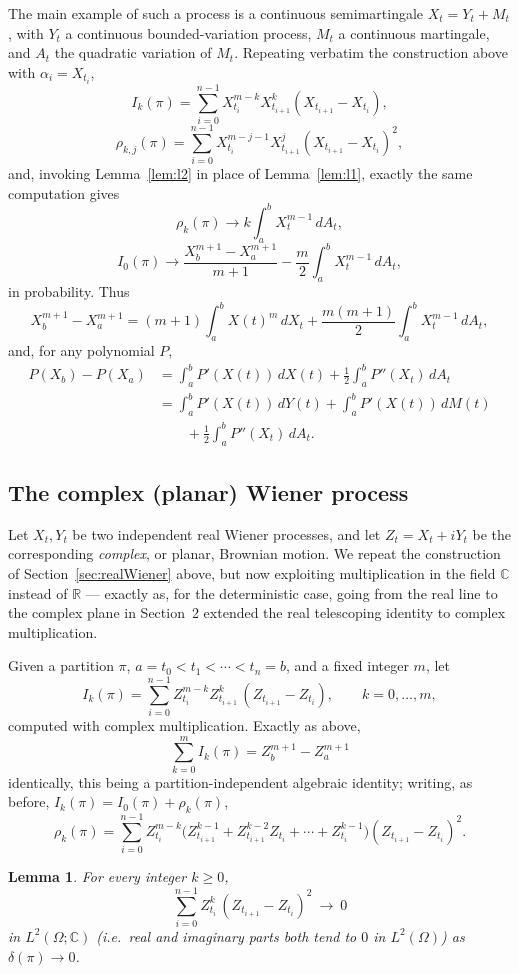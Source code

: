 \documentclass[11pt,fleqn]{article}
\def\C{\mathbb C}
\def\R{\mathbb R}
\def\ds{\displaystyle}
\theoremstyle{plain}
\newtheorem{lemma}[thm]{Lemma}
\theoremstyle{remark}
\begin{document}
The main example of such a process is a continuous semimartingale
$X_t=Y_t+M_t$, with $Y_t$ a continuous bounded-variation process, $M_t$ a
continuous martingale, and $A_t$ the quadratic variation of $M_t$.
Repeating verbatim the construction above with $\alpha_i=X_{t_i}$,
\[
I_k(\pi)=\ds\sum_{i=0}^{n-1}X_{t_i}^{m-k}X_{t_{i+1}}^k(X_{t_{i+1}}-X_{t_i}),
\]
\[
\rho_{k,j}(\pi)=\sum_{i=0}^{n-1}X_{t_i}^{m-j-1}X_{t_{i+1}}^j(X_{t_{i+1}}-X_{t_i})^2,
\]
and, invoking Lemma~\ref{lem:l2} in place of Lemma~\ref{lem:l1}, exactly
the same computation gives
\[
\rho_k(\pi)\longrightarrow k\int_a^bX_t^{m-1}\,dA_t,
\]
\[
I_0(\pi)\longrightarrow\frac{X_b^{m+1}-X_a^{m+1}}{m+1}-\frac m2\int_a^bX_t^{m-1}\,dA_t,
\]
in probability. Thus
\[
X_b^{m+1}-X_a^{m+1}=(m+1)\int_a^bX(t)^m\,dX_t+\frac{m(m+1)}2\int_a^bX_t^{m-1}\,dA_t,
\]
and, for any polynomial $P$,
\begin{align*}
P(X_b)-P(X_a)&=\int_a^bP'(X(t))\,dX(t)+\frac12\int_a^bP''(X_t)\,dA_t\\
&=\int_a^bP'(X(t))\,dY(t)+\int_a^bP'(X(t))\,dM(t)\\
&\qquad+\frac12\int_a^bP''(X_t)\,dA_t.
\end{align*}

\subsection{The complex (planar) Wiener process}

Let $X_t,Y_t$ be two independent real Wiener processes, and let
$Z_t=X_t+iY_t$ be the corresponding \emph{complex}, or planar, Brownian
motion. We repeat the construction of Section~\ref{sec:realWiener} above,
but now exploiting multiplication in the field $\C$ instead of $\R$ —
exactly as, for the deterministic case, going from the real line to the
complex plane in Section~2 extended the real telescoping identity to
complex multiplication.

Given a partition $\pi$, $a=t_0<t_1<\cdots<t_n=b$, and a fixed integer
$m$, let
\[
I_k(\pi)=\sum_{i=0}^{n-1} Z_{t_i}^{m-k}Z_{t_{i+1}}^k\,(Z_{t_{i+1}}-Z_{t_i}),
\qquad k=0,\ldots,m,
\]
computed with complex multiplication. Exactly as above,
\[
\sum_{k=0}^m I_k(\pi)=Z_b^{m+1}-Z_a^{m+1}
\]
identically, this being a partition-independent algebraic identity;
writing, as before, $I_k(\pi)=I_0(\pi)+\rho_k(\pi)$,
\[
\rho_k(\pi)=\sum_{i=0}^{n-1} Z_{t_i}^{m-k}\big(Z_{t_{i+1}}^{k-1}+
Z_{t_{i+1}}^{k-2}Z_{t_i}+\cdots+Z_{t_i}^{k-1}\big)(Z_{t_{i+1}}-Z_{t_i})^2.
\]

\begin{lemma}\label{lem:l3}
For every integer $k\ge0$,
\[
\sum_{i=0}^{n-1} Z_{t_i}^k\,(Z_{t_{i+1}}-Z_{t_i})^2\ \to\ 0
\]
in $L^2(\Omega;\C)$ (i.e.\ real and imaginary parts both tend to $0$ in
$L^2(\Omega)$) as $\delta(\pi)\to0$.
\end{lemma}
\end{document}
